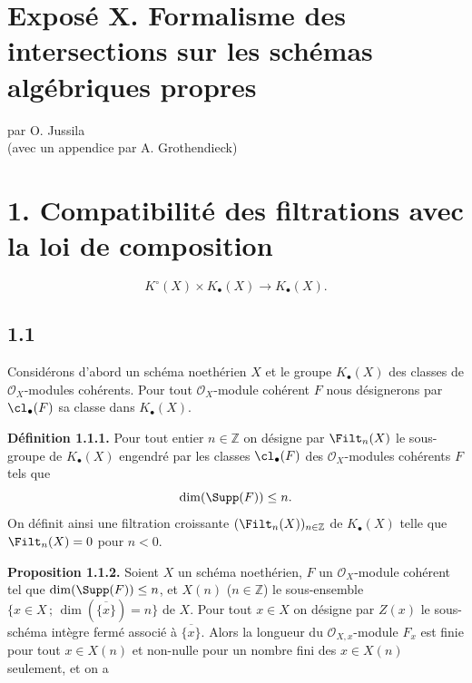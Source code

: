 \section*{Exposé X. Formalisme des intersections sur les schémas algébriques propres}
\begin{center}
par O. Jussila\\
(avec un appendice par A. Grothendieck)
\end{center}

\section*{1. Compatibilité des filtrations avec la loi de composition}
\[
K^\circ(X)\times K_\bullet(X)\longrightarrow K_\bullet(X).
\]

\subsection*{1.1}
Considérons d'abord un schéma noethérien $X$ et le groupe $K_\bullet(X)$ des classes de $\mathcal O_X$-modules cohérents. Pour tout $\mathcal O_X$-module cohérent $F$ nous désignerons par $\cl_\bullet(F)$ sa classe dans $K_\bullet(X)$.

\textbf{Définition 1.1.1.} Pour tout entier $n\in\mathbb Z$ on désigne par $\Filt_n(X)$ le sous-groupe de $K_\bullet(X)$ engendré par les classes $\cl_\bullet(F)$ des $\mathcal O_X$-modules cohérents $F$ tels que
\[
\dim(\Supp(F))\leq n.
\]
On définit ainsi une filtration croissante $(\Filt_n(X))_{n\in\mathbb Z}$ de $K_\bullet(X)$ telle que $\Filt_n(X)=0$ pour $n<0$.

\textbf{Proposition 1.1.2.} Soient $X$ un schéma noethérien, $F$ un $\mathcal O_X$-module cohérent tel que $\dim(\Supp(F))\leq n$, et $X(n)$ ($n\in\mathbb Z$) le sous-ensemble $\{x\in X\,;\,\dim(\overline{\{x\}})=n\}$ de $X$. Pour tout $x\in X$ on désigne par $Z(x)$ le sous-schéma intègre fermé associé à $\overline{\{x\}}$. Alors la longueur du $\mathcal O_{X,x}$-module $F_x$ est finie pour tout $x\in X(n)$ et non-nulle pour un nombre fini des $x\in X(n)$ seulement, et on a
